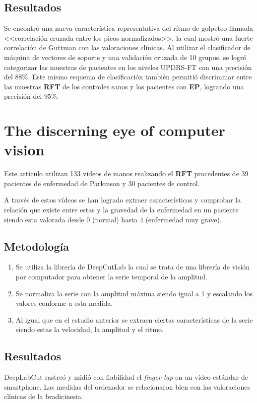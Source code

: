 \subsection{Resultados}
Se encontró una nueva característica representativa del ritmo de golpeteo llamada <<correlación cruzada entre los picos normalizados>>, la cual mostró una fuerte correlación de Guttman con las valoraciones clínicas. Al utilizar el clasificador de máquina de vectores de soporte y una validación cruzada de 10 grupos, se logró categorizar las muestras de pacientes en los niveles UPDRS-FT con una precisión del 88\%. Este mismo esquema de clasificación también permitió discriminar entre las muestras \textbf{RFT} de los controles sanos y los pacientes con \textbf{EP}, logrando una precisión del 95\%.


\section{The discerning eye of computer vision}
Este artículo \cite{williams2020discerning} utilizan 133 vídeos de manos realizando el \textbf{RFT} procedentes de 39 pacientes de enfermedad de Parkinson y 30 pacientes de control.

A través de estos vídeos se han logrado extraer características y comprobar la relación que existe entre estas y la gravedad de la enfermedad en un paciente siendo esta valorada desde 0 (normal) hasta 4 (enfermedad muy grave).


\subsection{Metodología}
\begin{enumerate}
	\item Se utiliza la librería de DeepCutLab la cual se trata de una librería de visión por computador para obtener la serie temporal de la amplitud.
	\item Se normaliza la serie con la amplitud máxima siendo igual a 1 y escalando los valores conforme a esta medida.
	\item Al igual que en el estudio anterior se extraen ciertas características de la serie siendo estas la velocidad, la amplitud y el ritmo.

\end{enumerate}
\subsection{Resultados}
DeepLabCut rastreó y midió con fiabilidad el \textit{finger-tap} en un vídeo estándar de smartphone. Las medidas del ordenador se relacionaron bien con las valoraciones clínicas de la bradicinesia.


